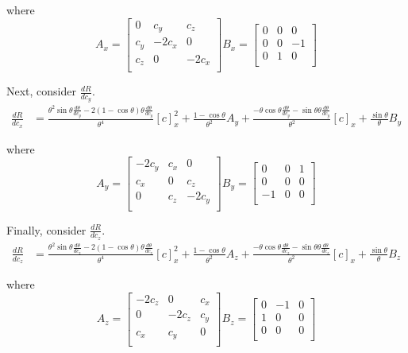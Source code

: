 \documentclass[a4paper]{article}
\begin{document}
where
\[
    A_x = \begin{bmatrix}
        0 & c_y & c_z \\
        c_y & -2 c_x & 0 \\
        c_z & 0 & -2 c_x \\
        \end{bmatrix}
    B_x = \begin{bmatrix}
        0 & 0 & 0 \\
        0 & 0 & -1 \\
        0 & 1 & 0 \\
        \end{bmatrix}
\]

Next, consider $\frac{dR}{dc_y}$.
\begin{align*}
    \frac{dR}{dc_x} &= \frac{\theta^2 \sin \theta \frac{d\theta}{dc_y} - 2 (1 - \cos \theta) \theta \frac{d\theta}{dc_y}}{\theta^4} [c]_x^2 + \frac{1 - \cos \theta}{\theta^2} A_y + \frac{-\theta \cos \theta \frac{d\theta}{dc_y} - \sin \theta \theta \frac{d\theta}{dc_y}}{\theta^2} [c]_x + \frac{\sin \theta}{\theta} B_y
\end{align*}

where
\[
    A_y = \begin{bmatrix}
        -2 c_y & c_x & 0 \\
        c_x & 0 & c_z \\
        0 & c_z & -2 c_y \\
        \end{bmatrix}
    B_y = \begin{bmatrix}
        0 & 0 & 1 \\
        0 & 0 & 0 \\
        -1 & 0 & 0 \\
        \end{bmatrix}
\]

Finally, consider $\frac{dR}{dc_z}$.
\begin{align*}
    \frac{dR}{dc_z} &= \frac{\theta^2 \sin \theta \frac{d\theta}{dc_z} - 2 (1 - \cos \theta) \theta \frac{d\theta}{dc_z}}{\theta^4} [c]_x^2 + \frac{1 - \cos \theta}{\theta^2} A_z + \frac{-\theta \cos \theta \frac{d\theta}{dc_z} - \sin \theta \theta \frac{d\theta}{dc_z}}{\theta^2} [c]_x + \frac{\sin \theta}{\theta} B_z
\end{align*}

where
\[
    A_z = \begin{bmatrix}
        -2 c_z & 0 & c_x \\
        0 & -2 c_z & c_y \\
        c_x & c_y & 0 \\
        \end{bmatrix}
    B_z = \begin{bmatrix}
        0 & -1 & 0 \\
        1 & 0 & 0 \\
        0 & 0 & 0 \\
        \end{bmatrix}
\]
\end{document}
